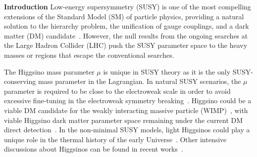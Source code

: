\documentclass[
    prl,
    twocolumn,
    superscriptaddress,
    nofootinbib,
    amsmath, amssymb,
    aps,
    reprint,
    floatfix
]{revtex4-2}
\newcommand{\Wei}[1]{\textcolor{green2} {Wei: #1}}
\newcommand{\px}[1]{\textcolor{blue} {PX: {\bf Comment:} {\it #1}}}
\begin{document}

\noindent
\textbf{Introduction}
Low-energy supersymmetry (SUSY) is one of the most compelling extensions of the Standard Model (SM) of particle physics, providing a natural solution to the hierarchy problem, the unification of gauge couplings, and  a dark matter (DM) candidate~\cite{Dreiner:2023yus, Martin:1997ns, Wang:2023suf, Haber:1984rc, Bae:2014yta}. However, the null results from the ongoing searches at the Large Hadron Collider (LHC) push the SUSY parameter space to  the heavy masses or regions that escape the conventional searches.

The Higgsino mass parameter $\mu$ is unique in SUSY theory as it is the only SUSY-conserving mass parameter in the Lagrangian.
In natural SUSY scenarios, the $\mu$ parameter is required to be close to the electroweak scale in order to avoid excessive fine-tuning in the electroweak symmetry breaking~\cite{Feng:2013pwa, vanBeekveld:2019tqp, Barbieri:1987fn, Arvanitaki:2013yja, Evans:2013jna, Baer:2014ica}. Higgsino could be a viable DM candidate for the weakly interacting massive particle (WIMP)~\cite{Delgado:2020url,Baer:2025srs}, with viable Higgsino dark matter parameter space remaining under the current DM direct detection~\cite{Martin:2024ytt, Martin:2024pxx}.   In the non-minimal SUSY models, light Higgsinos could play a unique role in the thermal history of the early Universe~\cite{Cao:2018rix, Cao:2019qng, Cao:2019evo, Cao:2021lmj, Cao:2021tuh, Yue:2025dqe, Liang:2025utb, Dong:2024juh, Wang:2024ozr, Chakraborti:2024pdn, Dai:2023pli, Khan:2025yit}. Other intensive discussions about Higgsinos can be found in recent works~\cite{Araz:2025bww, Zhou:2025xol, Carpenter:2023agq, Baer:2025zqt, Baer:2024hqm, Nagata:2025ycf, Baer:2024tfo, Fowlie:2024nhs, Li:2023hey, VanBeekveld:2021tgn, Baer:2020sgm, Bae:2019dgg, Baer:2017pba, Wang:2016otm, Fan:2024jvz, Du:2023qvj, Wang:2023bmh, Li:2022zap, Wang:2022rfd, Wang:2018idz, Khan:2025azf, Yin:2024bwv, Fu:2023sfk, Agin:2024yfs, Rodd:2024qsi, Liu:2020muv, Liu:2020ctf, Zhao:2022pnv}. 
\end{document}
